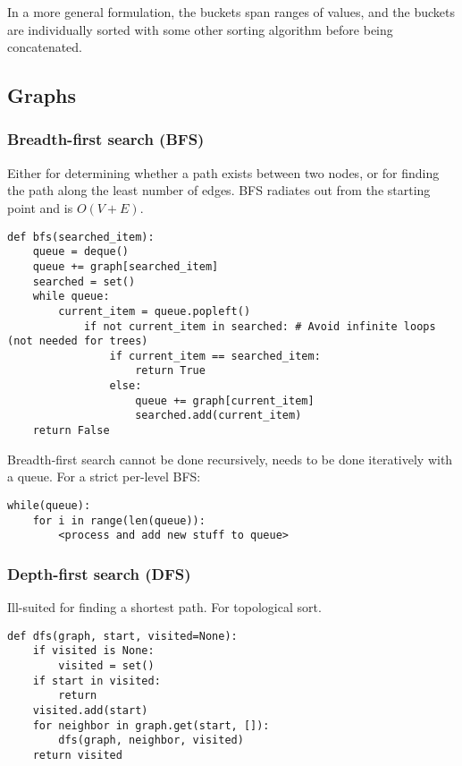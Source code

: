 \documentclass[8pt, table, xcdraw]{article}%
\begin{document}
In a more general formulation, the buckets span ranges of values, and the buckets are individually sorted with some other sorting algorithm before being concatenated.

\subsection{Graphs}

\subsubsection{Breadth-first search (BFS)}

Either for determining whether a path exists between two nodes, or for finding the path along the least number of edges. BFS radiates out from the starting point and is $O(V+E)$.

\begin{lstlisting}
def bfs(searched_item):
    queue = deque()
    queue += graph[searched_item]
    searched = set()
    while queue:
        current_item = queue.popleft()
            if not current_item in searched: # Avoid infinite loops (not needed for trees)
                if current_item == searched_item:
                    return True
                else:
                    queue += graph[current_item]
                    searched.add(current_item)
    return False
\end{lstlisting}

Breadth-first search cannot be done recursively, needs to be done iteratively with a queue. For a strict per-level BFS:

\begin{lstlisting}
while(queue):
	for i in range(len(queue)):
		<process and add new stuff to queue>
\end{lstlisting}

\subsubsection{Depth-first search (DFS)}

Ill-suited for finding a shortest path. For topological sort.

\begin{lstlisting}
def dfs(graph, start, visited=None):
    if visited is None:
        visited = set()
    if start in visited:
        return
    visited.add(start)
    for neighbor in graph.get(start, []):
        dfs(graph, neighbor, visited)
    return visited
\end{lstlisting}
\end{document}
